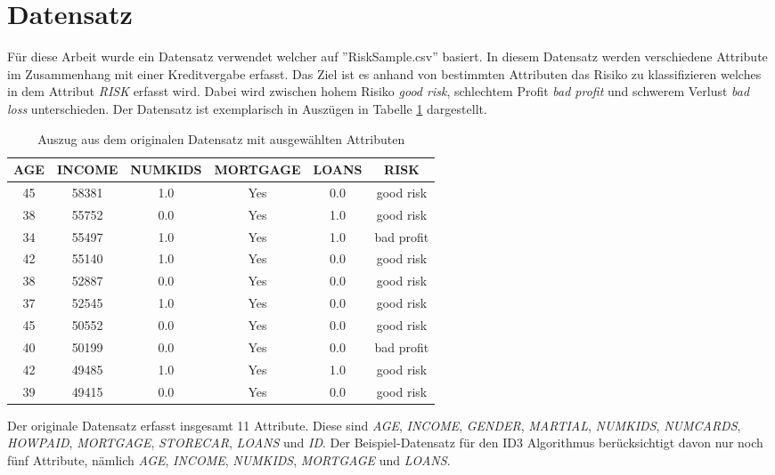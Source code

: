 \section{Datensatz}
\label{id3:datensatz}
Für diese Arbeit wurde ein Datensatz verwendet welcher auf ''RiskSample.csv'' basiert. \Autocite{RiskSample} In diesem Datensatz werden verschiedene Attribute im Zusammenhang mit einer Kreditvergabe erfasst. Das Ziel ist es anhand von bestimmten Attributen das Risiko zu klassifizieren welches in dem Attribut \textit{RISK} erfasst wird. Dabei wird zwischen hohem Risiko \textit{good risk}, schlechtem Profit \textit{bad profit} und schwerem Verlust \textit{bad loss} unterschieden.
Der Datensatz ist exemplarisch in Auszügen in Tabelle \ref{table:datensatz} dargestellt. 

\begin{center}
    \begin{table}[htbp]
        \begin{tabularx}{\linewidth}{cccccc}
            \toprule
            \textbf{AGE} & \textbf{INCOME} & \textbf{NUMKIDS} & \textbf{MORTGAGE} & \textbf{LOANS} & \textbf{RISK} \\
            \toprule
            45 & 58381 & 1.0 & Yes & 0.0 & good risk \\
            38 & 55752 & 0.0 & Yes & 1.0 & good risk \\
            34 & 55497 & 1.0 & Yes & 1.0 & bad profit \\
            42 & 55140 & 1.0 & Yes & 0.0 & good risk \\
            38 & 52887 & 0.0 & Yes & 0.0 & good risk \\
            37 & 52545 & 1.0 & Yes & 0.0 & good risk \\
            45 & 50552 & 0.0 & Yes & 0.0 & good risk \\
            40 & 50199 & 0.0 & Yes & 0.0 & bad profit \\
            42 & 49485 & 1.0 & Yes & 1.0 & good risk \\
            39 & 49415 & 0.0 & Yes & 0.0 & good risk \\
            \bottomrule
        \end{tabularx}
        \caption{Auszug aus dem originalen Datensatz mit ausgewählten Attributen}
        \label{table:datensatz}
    \end{table}
\end{center}

Der originale Datensatz erfasst insgesamt 11 Attribute. Diese sind \textit{AGE}, \textit{INCOME}, \textit{GENDER}, \textit{MARTIAL}, \textit{NUMKIDS}, \textit{NUMCARDS}, \textit{HOWPAID}, \textit{MORTGAGE}, \textit{STORECAR}, \textit{LOANS} und \textit{ID}. Der Beispiel-Datensatz für den ID3 Algorithmus berücksichtigt davon nur noch fünf Attribute, nämlich \textit{AGE}, \textit{INCOME}, \textit{NUMKIDS}, \textit{MORTGAGE} und \textit{LOANS}.

